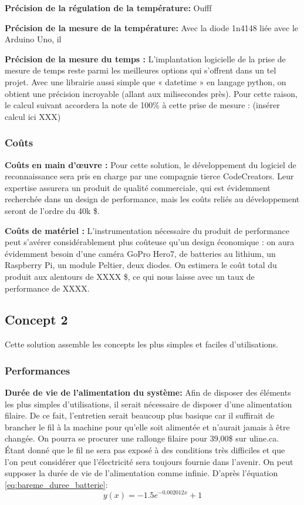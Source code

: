 \textbf{Précision de la régulation de la température:}
Oufff

\textbf{Précision de la mesure de la température:}
Avec la diode 1n4148 liée avec le Arduino Uno, il 

\textbf{Précision de la mesure du temps :}
L’implantation logicielle de la prise de mesure de temps reste parmi les meilleures options qui s’offrent dans un tel projet. Avec une librairie aussi simple que « datetime » en langage python, on obtient une précision incroyable (allant aux milisecondes près). Pour cette raison, le calcul suivant accordera la note de 100\% à cette prise de mesure : (insérer calcul ici XXX)

\subsubsection{Coûts}

\textbf{Coûts en main d’œuvre :}
Pour cette solution, le développement du logiciel de reconnaissance sera pris en charge par une compagnie tierce CodeCreators. Leur expertise assurera un produit de qualité commerciale, qui est évidemment recherchée dans un design de performance, mais les coûts reliés au développement seront de l’ordre du 40k \$.


\textbf{Coûts de matériel :}
L’instrumentation nécessaire du produit de performance peut s’avérer considérablement plus coûteuse qu'un design économique : on aura évidemment besoin d’une caméra GoPro Hero7, de batteries au lithium, un Raspberry Pi, un module Peltier, deux diodes. On estimera le coût total du produit aux alentours de XXXX \$, ce qui nous laisse avec un taux de performance de XXXX. 



\subsection{Concept 2}
Cette solution assemble les concepts les plus simples et faciles d'utilisations.

\subsubsection{Performances}

\textbf{Durée de vie de l'alimentation du système:} Afin de disposer des éléments les plus simples d'utilisations, il serait nécessaire de disposer d'une alimentation filaire. De ce fait, l'entretien serait beaucoup plus basique car il suffirait de brancher le fil à la machine pour qu'elle soit alimentée et n'aurait jamais à être changée. On pourra se procurer une rallonge filaire pour 39,00\$ sur uline.ca. Étant donné que le fil ne sera pas exposé à des conditions très difficiles et que l'on peut considérer que l'électricité sera toujours fournie dans l'avenir. On peut supposer la durée de vie de l'alimentation comme infinie.
D'après l'équation \ref{eq:bareme_duree_batterie}:
\begin{equation}
    y(x) = -1.5e^{-0.002012x} + 1 
        \end{equation}

